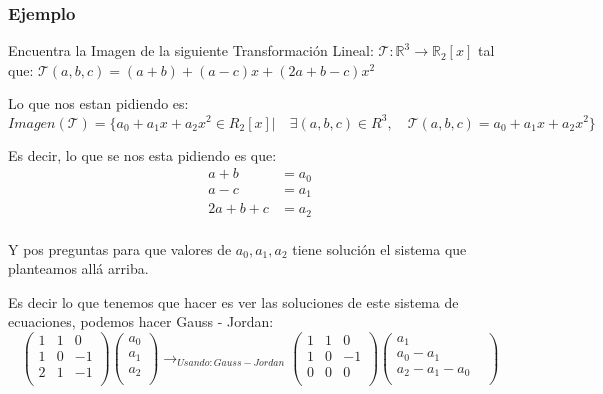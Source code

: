 \documentclass[12pt]{report}                                %
\begin{document}
            \clearpage
            \subsubsection{Ejemplo}
            Encuentra la Imagen de la siguiente Transformación Lineal:
            $\mathscr{T} : \mathbb{R}^3 \to \mathbb{R}_2[x]$ tal que: 
            $\mathscr{T}(a,b,c) = (a+b) + (a-c)x + (2a+b-c)x^2$

            Lo que nos estan pidiendo es:
            \begin{equation*}
                Imagen(\mathscr{T}) = 
                \{a_0+a_1x+a_2x^2 \in R_2[x] |\quad \exists (a,b,c) \in R^3 ,\quad 
                \mathscr{T}(a,b,c) = a_0+a_1x+a_2x^2\}
            \end{equation*}

            Es decir, lo que se nos esta pidiendo es que:
            \begin{equation*}
            \begin{split}
                a + b           & = a_0 \\
                a - c           & = a_1 \\
                2a + b + c      & = a_2 \\
             \end{split}
            \end{equation*}

            Y pos preguntas para que valores de $a_0, a_1, a_2$ tiene solución el 
            sistema que planteamos allá arriba.

            Es decir lo que tenemos que hacer es ver las soluciones de
            este sistema de ecuaciones, podemos hacer Gauss - Jordan:
            \begin{equation*}
                \begin{pmatrix} 1&1&0 \\ 1&0&-1 \\ 2&1&-1 \\\end{pmatrix} 
                \begin{pmatrix} a_0 \\ a_1 \\ a_2 \\\end{pmatrix}
                \to_{Usando: Gauss-Jordan}
                \begin{pmatrix} 1&1&0 \\ 1&0&-1 \\ 0&0&0 \\\end{pmatrix}
                \begin{pmatrix} a_1 & \\ a_0-a_1 &\\ a_2-a_1-a_0 &\\\end{pmatrix}
            \end{equation*}
\end{document}
